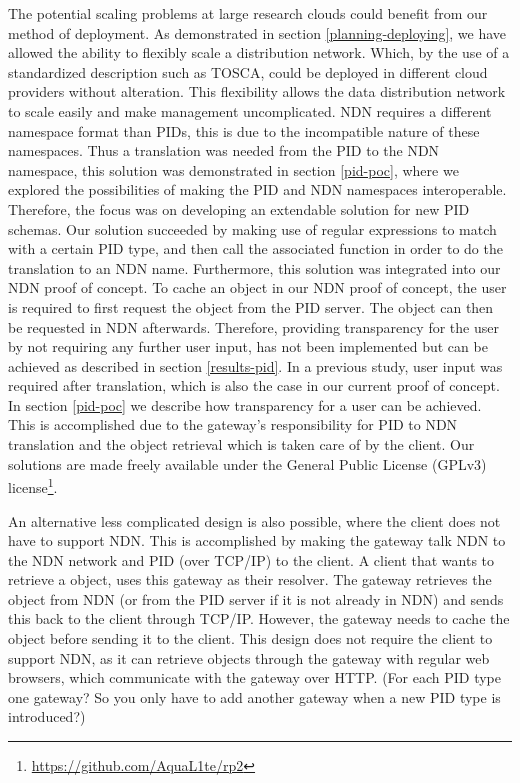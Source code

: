 The potential scaling problems at large research clouds could benefit from our method of deployment. As demonstrated in section \ref{planning-deploying}, we have allowed the ability to flexibly scale a distribution network. Which, by the use of a standardized description such as TOSCA, could be deployed in different cloud providers without alteration. This flexibility allows the data distribution network to scale easily and make management uncomplicated. NDN requires a different namespace format than PIDs, this is due to the incompatible nature of these namespaces. Thus a translation was needed from the PID to the NDN namespace, this solution was demonstrated in section \ref{pid-poc}, where we explored the possibilities of making the PID and NDN namespaces interoperable. Therefore, the focus was on developing an extendable solution for new PID schemas. Our solution succeeded by making use of regular expressions to match with a certain PID type, and then call the associated function in order to do the translation to an NDN name. Furthermore, this solution was integrated into our NDN proof of concept. To cache an object in our NDN proof of concept, the user is required to first request the object from the PID server. The object can then be requested in NDN afterwards. Therefore, providing transparency for the user by not requiring any further user input, has not been implemented but can be achieved as described in section \ref{results-pid}. In a previous study, user input was required after translation, which is also the case in our current proof of concept. In section \ref{pid-poc} we describe how transparency for a user can be achieved. This is accomplished due to the gateway’s responsibility for PID to NDN translation and the object retrieval which is taken care of by the client. Our solutions are made freely available under the General Public License (GPLv3) license\footnote{\url{https://github.com/AquaL1te/rp2}}.

An alternative less complicated design is also possible, where the client does not have to support NDN. This is accomplished by making the gateway talk NDN to the NDN network and PID (over TCP/IP) to the client. A client that wants to retrieve a object, uses this gateway as their resolver. The gateway retrieves the object from NDN (or from the PID server if it is not already in NDN) and sends this back to the client through TCP/IP. However, the gateway needs to cache the object before sending it to the client. This design does not require the client to support NDN, as it can retrieve objects through the gateway with regular web browsers, which communicate with the gateway over HTTP. (For each PID type one gateway? So you only have to add another gateway when a new PID type is introduced?)

